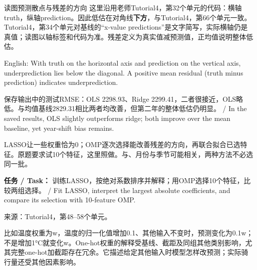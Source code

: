 \begin{StudyBlock}{读图}{预测散点与残差的方向}
这里沿用老师Tutorial4，第32个单元的代码：横轴truth，纵轴prediction。因此低估在对角线\textbf{下方}，与Tutorial4，第66个单元一致。Tutorial4，第34个单元对基线的“x-value predictions”是文字简写，实际横轴仍是真值；读图以轴标签和代码为准。残差定义为真实值减预测值，正均值说明整体低估。


English: With truth on the horizontal axis and prediction on the vertical axis, underprediction lies below the diagonal. A positive mean residual (truth minus prediction) indicates underprediction.
\end{StudyBlock}

保存输出中的测试RMSE：OLS 2298.93、Ridge 2299.41，二者很接近，OLS略低。与均值基线2829.31相比两者均改善，但第二年的整体低估仍明显。 / In the saved results, OLS slightly outperforms ridge; both improve over the mean baseline, yet year-shift bias remains.













LASSO让一些权重恰为0；OMP逐次选择能改善残差的方向，再联合拟合已选特征。原题要求试10个特征，这里照做。与、月份与季节可能相关，两种方法不必选同一批。


\textbf{任务 / Task：} 训练LASSO，按绝对系数排序并解释；用OMP选择10个特征，比较两组选择。 / Fit LASSO, interpret the largest absolute coefficients, and compare its selection with 10-feature OMP.


来源：Tutorial4，第48–58个单元。








比如温度权重为w，温度的归一化值增加0.1、其他输入不变时，预测变化为0.1w；不是增加1°C就变化w。One-hot权重的解释受基线、截距及同组其他类别影响，尤其完整one-hot加截距存在冗余。它描述给定其他输入时模型怎样改预测；实际骑行量还受其他因素影响。



